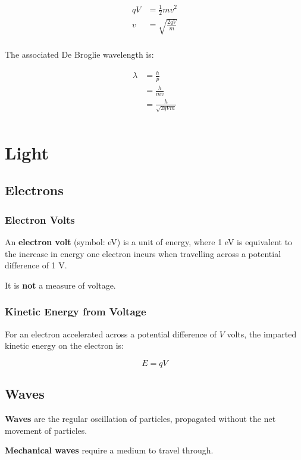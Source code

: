 \documentclass[a4paper,11pt]{report}
\begin{document}
$$
\begin{aligned}
qV & = \frac{1}{2}mv^2 \\
v & = \sqrt{\frac{2qV}{m}} \\
\end{aligned}
$$

The associated De Broglie wavelength is:

$$
\begin{aligned}
\lambda & = \frac{h}{p} \\
& = \frac{h}{mv} \\
& = \frac{h}{\sqrt{2qVm}} \\
\end{aligned}
$$




\chapter{Light}

\section{Electrons}

\subsection{Electron Volts}

An \textbf{electron volt} (symbol: eV) is a unit of energy, where 1 eV is
equivalent to the increase in energy one electron incurs when travelling across
a potential difference of 1 V.

It is \textbf{not} a measure of voltage.

\subsection{Kinetic Energy from Voltage}

For an electron accelerated across a potential difference of $V$ volts, the
imparted kinetic energy on the electron is:

$$
E = qV
$$


\section{Waves}

\textbf{Waves} are the regular oscillation of particles, propagated without the
net movement of particles.

\textbf{Mechanical waves} require a medium to travel through.
\end{document}

